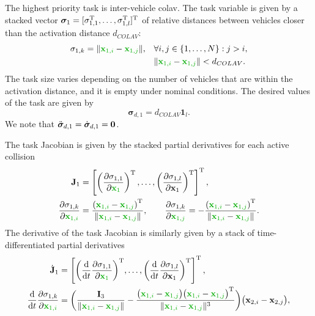 The highest priority task is inter-vehicle \acrfull{colav}. The task variable is given by a stacked vector $\bm{\sigma}_1 = [\sigma_{1,1}^{\mathrm{T}}, \ldots, \sigma_{1,l}^{\mathrm{T}}]^{\mathrm{T}}$ of relative distances between vehicles closer than the activation distance $d_{COLAV}$:
\begin{equation}
\begin{split}
    \sigma_{1,k} = \|\dm{\mathbf{x}_{1,i}} - \dm{\mathbf{x}_{1,j}}\|, \quad &\forall i,j \in \{1, \ldots, N\}: j > i,\\
    &\|\dm{\mathbf{x}_{1,i}} - \dm{\mathbf{x}_{1,j}}\| < d_{COLAV}.
    \end{split}
\end{equation}
The task size varies depending on the number of vehicles that are within the activation distance, and it is empty under nominal conditions. The desired values of the task are given by
\begin{equation}
    \bm{\sigma}_{d,1} = d_{COLAV} \mathbf{1}_l.
\end{equation}
We note that $\ddot{\bm{\sigma}}_{d,1} = \dot{\bm{\sigma}}_{d,1}= \mathbf{0}$.

The task Jacobian is given by the stacked partial derivatives for each active collision
\begin{subequations}
\begin{align}
    \mathbf{J}_1 &= \left[\left(\frac{\partial \sigma_{1,1}}{\partial \dm{\mathbf{x}_1}}\right)\T, \ldots, \left(\frac{\partial \sigma_{1,l}}{\partial \mathbf{x}_1}\right)\T\right]\T,\\
    \frac{\partial \sigma_{1,k}}{\partial \dm{\mathbf{x}_{1,i}}} &=\frac{\left(\dm{\mathbf{x}_{1,i}}-\dm{\mathbf{x}_{1,j}}\right) \T}{\|\dm{\mathbf{x}_{1,i}} - \dm{\mathbf{x}_{1,j}}\|}, \qquad
    \frac{\partial \sigma_{1,k}}{\partial \dm{\mathbf{x}_{1,j}}} = -\frac{\left(\dm{\mathbf{x}_{1,i}}-\dm{\mathbf{x}_{1,j}}\right) \T}{\|\dm{\mathbf{x}_{1,i}} - \dm{\mathbf{x}_{1,j}}\|}.
\end{align}
\end{subequations}
The derivative of the task Jacobian is similarly given by a stack of time-differentiated partial derivatives
\begin{subequations}
\begin{align}
    \dot{\mathbf{J}}_1 &= \left[{\left(\frac{{\rm d}}{{\rm d}t}\frac{\partial \sigma_{1,1}}{\partial \dm{\mathbf{x}_1}}\right)}\T, \ldots, {\left(\frac{{\rm d}}{{\rm d}t}\frac{\partial \sigma_{1,l}}{\partial \mathbf{x}_1}\right)}\T\right]\T,\\
    {\frac{{\rm d}}{{\rm d}t}\frac{\partial \sigma_{1,k}}{\partial \dm{\mathbf{x}_{1,i}}}} &= \bigg(\frac{\mathbf{I}_3}{\|\dm{\mathbf{x}_{1,i}} - \dm{\mathbf{x}_{1,j}}\|} - \frac{\bigl(\dm{\mathbf{x}_{1,i}}-\dm{\mathbf{x}_{1,j}}\bigr)\bigl(\dm{\mathbf{x}_{1,i}}-\dm{\mathbf{x}_{1,j}}\bigr)\T}{\|\dm{\mathbf{x}_{1,i}} - \dm{\mathbf{x}_{1,j}}\|^3}\bigg)\bigl(\mathbf{x}_{2,i}-\mathbf{x}_{2,j}\bigr),
\end{align}
\end{subequations}

